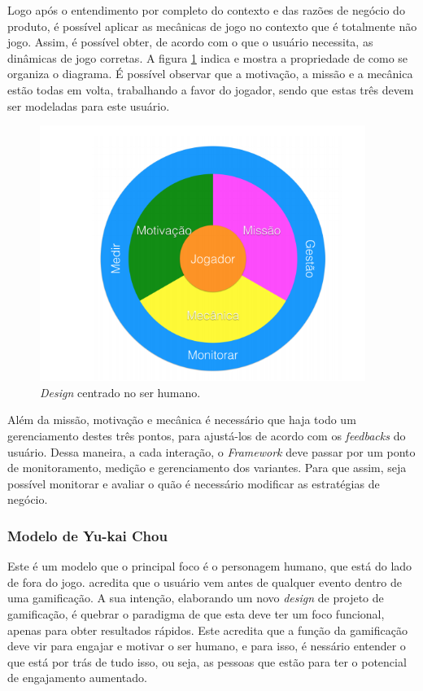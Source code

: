 Logo após o entendimento por completo do contexto e das razões de negócio do
produto, é possível aplicar as mecânicas de jogo no contexto que é totalmente
não jogo. Assim, é possível obter, de acordo com o que o usuário necessita, as
dinâmicas de jogo corretas. A figura \ref{fig:Kumar} indica e mostra a propriedade de
como se organiza o diagrama. É possível observar que a motivação, a missão e a
mecânica estão todas em volta, trabalhando a favor do jogador, sendo que estas
três devem ser modeladas para este usuário.

\begin{figure}[h]
    \centering
    \includegraphics[width=400px, scale=1]{figuras/kumar}
    \caption{ \textit{Design} centrado no ser humano.}
    \label{fig:Kumar}
\end{figure}

Além da missão, motivação e mecânica é necessário que haja todo um gerenciamento
destes três pontos, para ajustá-los de acordo com os \textit{feedbacks} do usuário. Dessa
maneira, a cada interação, o \textit{Framework} deve passar por um ponto de monitoramento,
medição e gerenciamento dos variantes. Para que assim, seja possível monitorar e
avaliar o quão é necessário modificar as estratégias de negócio.

\subsubsection{Modelo de Yu-kai Chou}
\label{sub:modelodeyu-kaichou}
Este é um modelo que o principal foco é o personagem humano, que está do lado
de fora do jogo. \cite{chou2015actionable} acredita que o usuário vem antes de qualquer evento
dentro de uma gamificação. A sua intenção, elaborando um novo \textit{design} de projeto
de gamificação, é quebrar o paradigma de que esta deve ter um foco funcional,
apenas para obter resultados rápidos. Este acredita que a função da gamificação
deve vir para engajar e motivar o ser humano, e para isso, é nessário entender o
que está por trás de tudo isso, ou seja, as pessoas que estão para ter o
potencial de engajamento aumentado.

